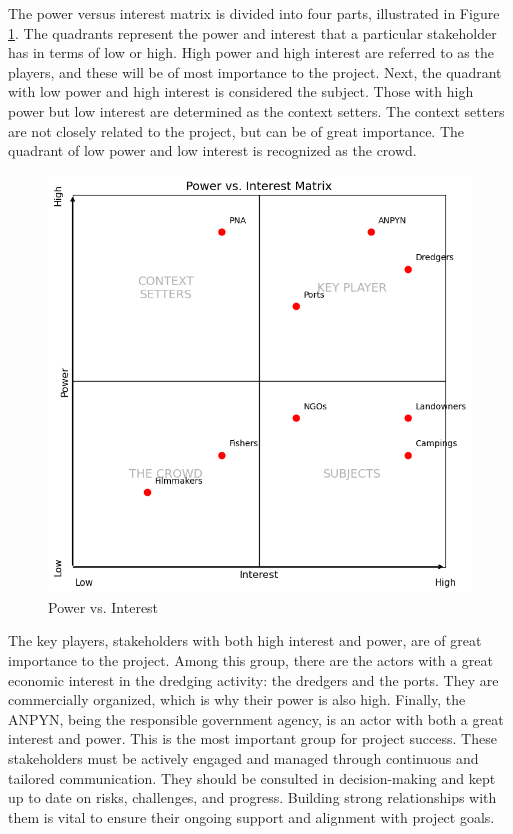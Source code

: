 The power versus interest matrix is divided into four parts, illustrated in Figure \ref{fig:power-interest}. The quadrants represent the power and interest that a particular stakeholder has in terms of low or high. High power and high interest are referred to as the players, and these will be of most importance to the project. Next, the quadrant with low power and high interest is considered the subject. Those with high power but low interest are determined as the context setters. The context setters are not closely related to the project, but can be of great importance. The quadrant of low power and low interest is recognized as the crowd.

\begin{figure}[H]
    \centering
    \includegraphics[width=0.70\linewidth]{figures/ch3/PowerVSInterest.png}
    \caption{Power vs. Interest}
    \label{fig:power-interest}
\end{figure}

The key players, stakeholders with both high interest and power, are of great importance to the project. Among this group, there are the actors with a great economic interest in the dredging activity: the dredgers and the ports. They are commercially organized, which is why their power is also high. Finally, the ANPYN, being the responsible government agency, is an actor with both a great interest and power. This is the most important group for project success. These stakeholders must be actively engaged and managed through continuous and tailored communication. They should be consulted in decision-making and kept up to date on risks, challenges, and progress. Building strong relationships with them is vital to ensure their ongoing support and alignment with project goals.

